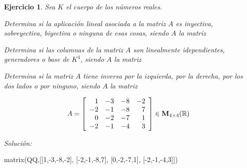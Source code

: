 \documentclass[12pt]{amsart}
\newtheorem{ejer}{Ejercicio}
\begin{document}
\begin{ejer} Sea $K$ el cuerpo de los n\'umeros reales.
\newline
\noindent\begin{minipage}{\textwidth}
\begin{tcolorbox}[colback = green!20!white,title=Versión Aplicaciones]
Determina si la aplicaci\'on lineal asociada a la matriz $A$ es inyectiva, sobreyectiva, biyectiva o ninguna de esas cosas, siendo $A$ la matriz \end{tcolorbox}
\end{minipage} \newline
\noindent\begin{minipage}{\textwidth}
\begin{tcolorbox}[colback = blue!20!white,title=Versión Vectores]
Determina si las columnas de la matriz $A$ son linealmente idependientes, generadores o base de $K^{4}$, siendo $A$ la matriz \end{tcolorbox}
\end{minipage} \newline
\noindent\begin{minipage}{\textwidth} 
\begin{tcolorbox}[colback = red!20!white,title=Versión Inversas]
Determina si la matriz $A$ tiene inversa por la izquierda, por la derecha, por los dos lados o por ninguno, siendo $A$ la matriz 
\end{tcolorbox}
\end{minipage}
\[ A = \left[\begin{array}{rrrr}
1 & -3 & -8 & -2 \\
-2 & -1 & -8 & 7 \\
0 & -2 & -7 & 1 \\
-2 & -1 & -4 & 3
\end{array}\right] \in {\bf M}_{4\times 4}({\mathbb R})\]
\end{ejer}

{\it Soluci\'on:}

\begin{sageblock}
matrix(QQ,[[1,-3,-8,-2],
[-2,-1,-8,7],
[0,-2,-7,1],
[-2,-1,-4,3]])
\end{sageblock}

\end{document}
